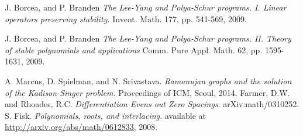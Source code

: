 \documentclass[11pt]{article}
\begin{document}
\begin{thebibliography}{1}

   J. Borcea, and P. Branden {\em The Lee-Yang and Polya-Schur programs. I. Linear operators preserving stability.} Invent. Math. 177, pp. 541-569, 2009.

  J. Borcea, and P. Branden {\em The Lee-Yang and Polya-Schur programs. II. Theory of stable polynomials and applications} Comm. Pure Appl. Math. 62, pp. 1595-1631, 2009.

    A. Marcus, D. Spielman, and N. Srivastava. {\em Ramanujan graphs and the solution of the Kadison-Singer problem.} Proceedings of ICM, Seoul, 2014.
 Farmer, D.W. and Rhoades, R.C.
 \emph{Differentiation Evens out Zero Spacings}.
 arXiv:math/0310252.
    S. Fisk. {\em Polynomials, roots, and interlacing.} available at \url{http://arxiv.org/abs/math/0612833}, 2008.
  \end{thebibliography}
\end{document}
